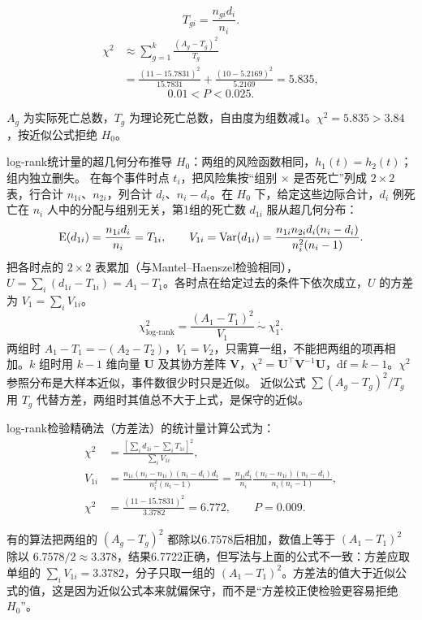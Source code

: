 \[
T_{gi}=\frac{n_{gi}d_i}{n_i}.
\]
\begin{align*}
\chi^2&\approx\sum_{g=1}^k\frac{(A_g-T_g)^2}{T_g}\\
&=\frac{(11-15.7831)^2}{15.7831}+\frac{(10-5.2169)^2}{5.2169}=5.835,
\end{align*}
\[
0.01<P<0.025.
\]
\begin{annotation}$A_g$ 为实际死亡总数，$T_g$ 为理论死亡总数，自由度为组数减1。$\chi^2=5.835>3.84$，按近似公式拒绝 $H_0$。\end{annotation}
\begin{derivation}{log-rank统计量的超几何分布推导}
$H_0$：两组的风险函数相同，$h_1(t)=h_2(t)$；组内独立删失。
在每个事件时点 $t_i$，把风险集按“组别 $\times$ 是否死亡”列成 $2\times2$ 表，行合计 $n_{1i}$、$n_{2i}$，列合计 $d_i$、$n_i-d_i$。在 $H_0$ 下，给定这些边际合计，$d_i$ 例死亡在 $n_i$ 人中的分配与组别无关，第1组的死亡数 $d_{1i}$ 服从超几何分布：
\[
\operatorname{E}(d_{1i})=\frac{n_{1i}d_i}{n_i}=T_{1i},\qquad
V_{1i}=\operatorname{Var}(d_{1i})=\frac{n_{1i}n_{2i}d_i(n_i-d_i)}{n_i^2(n_i-1)} .
\]
把各时点的 $2\times2$ 表累加（与Mantel--Haenszel检验相同），$U=\sum_i(d_{1i}-T_{1i})=A_1-T_1$。各时点在给定过去的条件下依次成立，$U$ 的方差为 $V_1=\sum_iV_{1i}$。
\[
\chi^2_{\text{log-rank}}=\frac{(A_1-T_1)^2}{V_1}\ \dot\sim\ \chi^2_1 .
\]
两组时 $A_1-T_1=-(A_2-T_2)$，$V_1=V_2$，只需算一组，不能把两组的项再相加。$k$ 组时用 $k-1$ 维向量 $\bm U$ 及其协方差阵 $\bm V$，$\chi^2=\bm U^\top\bm V^{-1}\bm U$，$\mathrm{df}=k-1$。$\chi^2$ 参照分布是大样本近似，事件数很少时只是近似。
近似公式 $\sum(A_g-T_g)^2/T_g$ 用 $T_g$ 代替方差，两组时其值总不大于上式，是保守的近似。
\end{derivation}
log-rank检验精确法（方差法）的统计量计算公式为：
\begin{align*}
\chi^2&=\frac{[\sum_i d_{1i}-\sum_i T_{1i}]^2}{\sum_i V_{1i}},\\
V_{1i}&=\frac{n_{1i}(n_i-n_{1i})(n_i-d_i)d_i}{n_i^2(n_i-1)}
=\frac{n_{1i}d_i}{n_i}\frac{(n_i-n_{1i})(n_i-d_i)}{n_i(n_i-1)},\\
\chi^2&=\frac{(11-15.7831)^2}{3.3782}=6.772,\qquad P=0.009.
\end{align*}
\begin{annotation}有的算法把两组的 $(A_g-T_g)^2$ 都除以6.7578后相加，数值上等于 $(A_1-T_1)^2$ 除以 $6.7578/2\approx3.378$，结果6.7722正确，但写法与上面的公式不一致：方差应取单组的 $\sum_iV_{1i}=3.3782$，分子只取一组的 $(A_1-T_1)^2$。方差法的值大于近似公式的值，这是因为近似公式本来就偏保守，而不是“方差校正使检验更容易拒绝 $H_0$”。\end{annotation}
